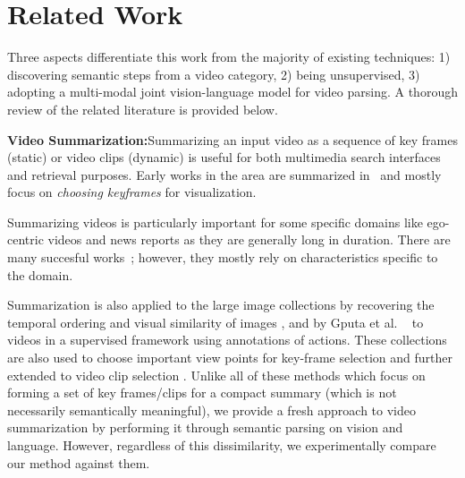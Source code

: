 \section{Related Work}
Three aspects differentiate this work from the majority of existing techniques: 1) discovering semantic steps from a video category, 2) being unsupervised, 3) adopting a multi-modal joint vision-language model for video parsing. A thorough review of the related literature is provided below.

\noindent\textbf{Video Summarization:}Summarizing an input video as a sequence of key frames (static) or video clips (dynamic) is useful for both multimedia search interfaces and retrieval purposes. Early works in the area are summarized in~\cite{vidAbstraction} and mostly focus on \emph{choosing keyframes} for visualization.

Summarizing videos is particularly important for some specific domains like ego-centric videos and news reports as they are generally long in duration. There are many succesful works~\cite{lee2012discovering, lu2013story,rui2000automatically}; however, they mostly rely on characteristics specific to the domain.

Summarization is also applied to the large image collections by recovering the temporal ordering and visual similarity of images \cite{storyGraph}, and by Gputa et al. ~\cite{gupta2009understanding} to videos in a supervised framework using annotations of actions. These collections are also used to choose important view points for key-frame selection \cite{khosla2013large} and further extended to video clip selection \cite{kim2014joint,potapov2014category}. Unlike all of these methods which  focus on forming a set of key frames/clips for a compact summary (which is not necessarily semantically meaningful), we provide a fresh approach to video summarization by performing it through semantic parsing on vision and language. However, regardless of this dissimilarity, we experimentally compare our method against them.

